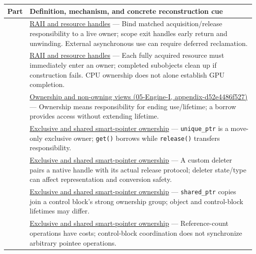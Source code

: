 {\def\LTcaptype{none} %
\begin{longtable}[]{@{}
  >{\raggedright\arraybackslash}p{}
  >{\raggedright\arraybackslash}p{}@{}}
\toprule\noalign{}
\begin{minipage}[b]{\linewidth}\raggedright
Part
\end{minipage} & \begin{minipage}[b]{\linewidth}\raggedright
Definition, mechanism, and concrete reconstruction cue
\end{minipage} \\
\midrule\noalign{}
\endhead
\bottomrule\noalign{}
\endlastfoot
148 & \hyperref[appendix-69739d3ab49b]{RAII and resource handles} --- Bind matched acquisition/release responsibility to a live owner; scope exit handles early return and unwinding. External asynchronous use can require deferred reclamation. \\
149 & \hyperref[appendix-69739d3ab49b]{RAII and resource handles} --- Each fully acquired resource must immediately enter an owner; completed subobjects clean up if construction fails. CPU ownership does not alone establish GPU completion. \\
150 & \href{../05-Engine-I/main.pdf\#nameddest=appendix-d52e4486f527}{Ownership and non-owning views (05-Engine-I, appendix-d52e4486f527)} --- Ownership means responsibility for ending use/lifetime; a borrow provides access without extending lifetime. \\
151 & \hyperref[appendix-51602cabe815]{Exclusive and shared smart-pointer ownership} --- \texttt{unique\_ptr} is a move-only exclusive owner; \texttt{get()} borrows while \texttt{release()} transfers responsibility. \\
152 & \hyperref[appendix-51602cabe815]{Exclusive and shared smart-pointer ownership} --- A custom deleter pairs a native handle with its actual release protocol; deleter state/type can affect representation and conversion safety. \\
153 & \hyperref[appendix-51602cabe815]{Exclusive and shared smart-pointer ownership} --- \texttt{shared\_ptr} copies join a control block's strong ownership group; object and control-block lifetimes may differ. \\
154 & \hyperref[appendix-51602cabe815]{Exclusive and shared smart-pointer ownership} --- Reference-count operations have costs; control-block coordination does not synchronize arbitrary pointee operations. \\

\end{longtable}}
